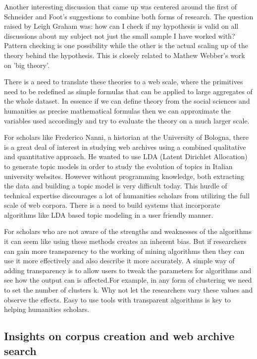 Another interesting discussion that came up was centered around the first of Schneider and Foot's suggestions to combine both forms of research. The question raised by Leigh Graham was: how can I check if my hypothesis is valid on all discussions about my subject not just the small sample I have worked with? Pattern checking is one possibility while the other is the actual scaling up of the theory behind the hypothesis. This is closely related to Mathew Webber's work on 'big theory'. 

There is a need to translate these theories to a web scale, where the primitives need to be redefined as simple formulas that can be applied to large aggregates of the whole dataset. In essence if we can define theory from the social sciences and humanities as precise mathematical formulas then we can approximate the variables used accordingly and try to evaluate the theory on a much larger scale.

For scholars like Frederico Nanni, a historian at the University of Bologna, there is a great deal of interest in studying web archives using a combined qualitative and quantitative approach. He wanted to use LDA (Latent Dirichlet Allocation) to generate topic models in order to study the evolution of topics in Italian university websites. However without programming knowledge, both extracting the data and building a topic model is very difficult today. This hurdle of technical expertise discourages a lot of humanities scholars from utilizing the full scale of web corpora. There is a need to build systems that incorporate algorithms like LDA based topic modeling in a user friendly manner.  

For scholars who are not aware of the strengths and weaknesses of the algorithms it can seem like using these methods creates an inherent bias. But if researchers can gain more transparency to the working of mining algorithms then they can use it more effectively and also describe it more accurately. A simple way of adding transparency is to allow users to tweak the parameters for algorithms and see how the output can is affected.For example, in any form of clustering we need to set the number of clusters k. Why not let the researchers vary these values and observe the effects. Easy to use tools with transparent algorithms is key to helping humanities scholars.


\subsection{Insights on corpus creation and web archive search} %
\label{sub:data_gathering_ii}

